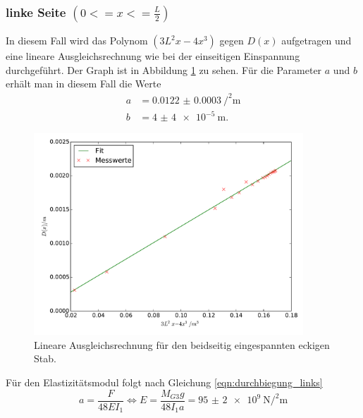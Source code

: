 \subsubsection{linke Seite $(0 <= x <= \frac{L}{2})$}
In diesem Fall wird das Polynom $\left(3 L^2 x - 4 x^3\right)$ gegen $D(x)$
aufgetragen und eine lineare Ausgleichsrechnung wie bei der einseitigen Einspannung
durchgeführt. Der Graph ist in Abbildung \ref{fig:plot_beidseitig1} zu sehen.
Für die Parameter $a$ und $b$ erhält man in diesem Fall die Werte
\begin{align*}
  a &= \SI{0.0122(3)}{\per\squared\meter}\\
  b &= \SI{4(4)e-5}{\meter}.
\end{align*}
\begin{figure}
  \centering
  \includegraphics[width=0.9\textwidth]{stab1_beidseitig_links.pdf}
  \caption{Lineare Ausgleichsrechnung für den beidseitig eingespannten eckigen Stab.}
  \label{fig:plot_beidseitig1}
\end{figure}
Für den Elastizitätsmodul folgt nach Gleichung \eqref{eqn:durchbiegung_links}
\begin{equation}
  a = \frac{F}{48 E I_1} \iff E = \frac{M_{G3} g}{48 I_1 a}
  = \SI{95(2)e+9}{\newton\per\squared\meter}
  \label{eqn:Emodul3}
\end{equation}


